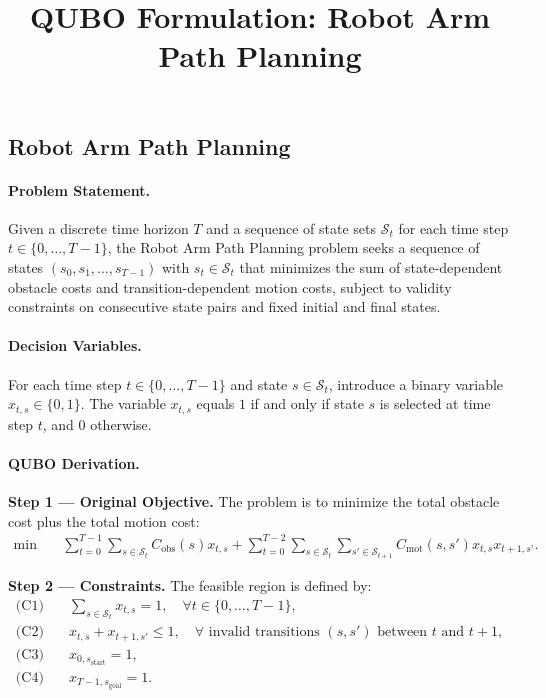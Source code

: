 \documentclass[12pt]{article}
\title{QUBO Formulation: Robot Arm Path Planning}
\date{}
\begin{document}
\maketitle

\subsection*{Robot Arm Path Planning}

\paragraph{Problem Statement.}
Given a discrete time horizon $T$ and a sequence of state sets $\mathcal{S}_t$ for each time step $t \in \{0, \dots, T-1\}$, the Robot Arm Path Planning problem seeks a sequence of states $(s_0, s_1, \dots, s_{T-1})$ with $s_t \in \mathcal{S}_t$ that minimizes the sum of state-dependent obstacle costs and transition-dependent motion costs, subject to validity constraints on consecutive state pairs and fixed initial and final states.

\paragraph{Decision Variables.}
For each time step $t \in \{0, \dots, T-1\}$ and state $s \in \mathcal{S}_t$, introduce a binary variable $x_{t,s} \in \{0,1\}$. The variable $x_{t,s}$ equals $1$ if and only if state $s$ is selected at time step $t$, and $0$ otherwise.

\paragraph{QUBO Derivation.}
\textbf{Step 1 --- Original Objective.} The problem is to minimize the total obstacle cost plus the total motion cost:
\begin{align}
\min \quad & \sum_{t=0}^{T-1} \sum_{s \in \mathcal{S}_t} C_{\text{obs}}(s) x_{t,s} + \sum_{t=0}^{T-2} \sum_{s \in \mathcal{S}_t} \sum_{s' \in \mathcal{S}_{t+1}} C_{\text{mot}}(s,s') x_{t,s} x_{t+1,s'}.
\end{align}

\textbf{Step 2 --- Constraints.} The feasible region is defined by:
\begin{align}
\text{(C1)} \quad & \sum_{s \in \mathcal{S}_t} x_{t,s} = 1, \quad \forall t \in \{0, \dots, T-1\}, \\
\text{(C2)} \quad & x_{t,s} + x_{t+1,s'} \le 1, \quad \forall \text{ invalid transitions } (s,s') \text{ between } t \text{ and } t+1, \\
\text{(C3)} \quad & x_{0, s_{\text{start}}} = 1, \\
\text{(C4)} \quad & x_{T-1, s_{\text{goal}}} = 1.
\end{align}
\end{document}
